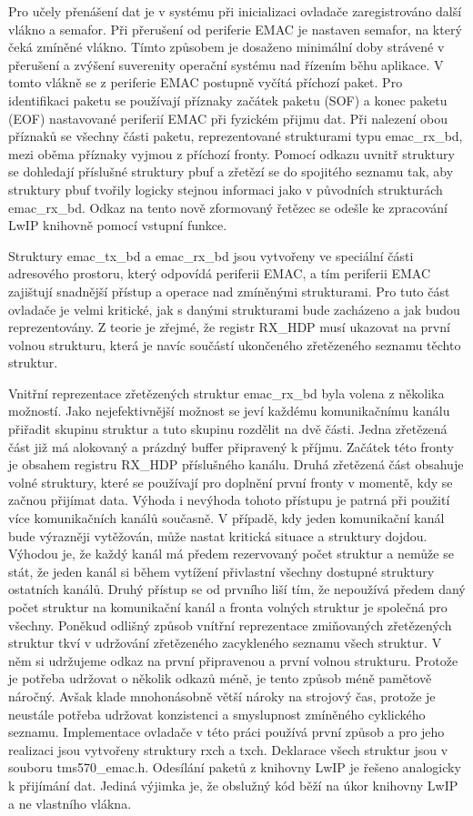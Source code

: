 Pro učely přenášení dat je v systému při inicializaci ovladače zaregistrováno další vlákno a semafor.
Při přerušení od periferie EMAC je nastaven semafor, na který čeká zmíněné vlákno.
Tímto způsobem je dosaženo minimální doby strávené v přerušení a zvýšení suverenity operační systému nad řízením běhu aplikace.
V tomto vlákně se z periferie EMAC postupně vyčítá příchozí paket.
Pro identifikaci paketu se používají příznaky začátek paketu (SOF) a konec paketu (EOF) nastavované periferií EMAC při fyzickém přijmu dat.
Při nalezení obou příznaků se všechny části paketu, reprezentované strukturami typu emac\_rx\_bd, mezi oběma příznaky vyjmou z příchozí fronty.
Pomocí odkazu uvnitř struktury se dohledají příslušné struktury pbuf a zřetězí se do spojitého seznamu tak, aby struktury pbuf tvořily logicky stejnou informaci jako v původních strukturách emac\_rx\_bd.
Odkaz na tento nově zformovaný řetězec se odešle ke zpracování LwIP knihovně pomocí vstupní funkce.

Struktury emac\_tx\_bd a emac\_rx\_bd jsou vytvořeny ve speciální části adresového prostoru, který odpovídá periferii EMAC, a tím periferii EMAC zajištují snadnější přístup a operace nad zmíněnými strukturami.
Pro tuto část ovladače je velmi kritické, jak s danými strukturami bude zacházeno a jak budou reprezentovány.
Z teorie je zřejmé, že registr RX\_HDP musí ukazovat na první volnou strukturu, která je navíc součástí ukončeného zřetězeného seznamu těchto struktur.

Vnitřní reprezentace zřetězených struktur emac\_rx\_bd byla volena z několika možností.
Jako nejefektivnější možnost se jeví každému komunikačnímu kanálu přiřadit skupinu struktur a tuto skupinu rozdělit na dvě části.
Jedna zřetězená část již má alokovaný a prázdný buffer připravený k příjmu.
Začátek této fronty je obsahem registru RX\_HDP příslušného kanálu.
Druhá zřetězená část obsahuje volné struktury, které se používají pro doplnění první fronty v momentě, kdy se začnou přijímat data.
Výhoda i nevýhoda tohoto přístupu je patrná při použití více komunikačních kanálů současně.
V případě, kdy jeden komunikační kanál bude výrazněji vytěžován, může nastat kritická situace a struktury dojdou.
Výhodou je, že každý kanál má předem rezervovaný počet struktur a nemůže se stát, že jeden kanál si během vytížení přivlastní všechny dostupné struktury ostatních kanálů.
Druhý přístup se od prvního liší tím, že nepoužívá předem daný počet struktur na komunikační kanál a fronta volných struktur je společná pro všechny.
Poněkud odlišný způsob vnítřní reprezentace zmiňovaných zřetězených struktur tkví v udržování zřetězeného zacykleného seznamu všech struktur.
V něm si udržujeme odkaz na první připravenou a první volnou strukturu.
Protože je potřeba udržovat o několik odkazů méně, je tento způsob méně pamětově náročný.
Avšak klade mnohonásobně větší nároky na strojový čas, protože je neustále potřeba udržovat konzistenci a smyslupnost zmíněného cyklického seznamu.
Implementace ovladače v této práci používá první způsob a pro jeho realizaci jsou vytvořeny struktury rxch a txch.
Deklarace všech struktur jsou v souboru tms570\_emac.h.
Odesílání paketů z knihovny LwIP je řešeno analogicky k přijímání dat.
Jediná výjimka je, že obslužný kód běží na úkor knihovny LwIP a ne vlastního vlákna.

